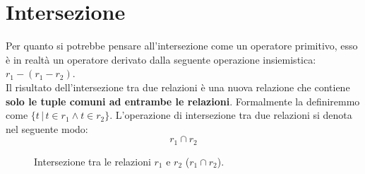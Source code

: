 \documentclass[12pt]{report}
\begin{document}
	\section{Intersezione}
	Per quanto si potrebbe pensare all'intersezione come un operatore primitivo, esso è in realtà un operatore derivato dalla seguente operazione insiemistica: $r_1 - (r_1 - r_2)$.\\
	Il risultato dell'intersezione tra due relazioni è una nuova relazione che contiene \textbf{solo le tuple comuni ad entrambe le relazioni}. Formalmente la definiremmo come $\{t \, |\, t \in r_1 \wedge t \in r_2\}$.
	L'operazione di intersezione tra due relazioni si denota nel seguente modo:
	\[
		r_1 \cap r_2
	\]
	\begin{figure}[htbp]
		\centering
		\caption{Intersezione tra le relazioni $r_1$ e $r_2$ ($r_1 \cap r_2$).}
		\label{fig:intersezione_relazioni}
	\end{figure}
	
\end{document}
